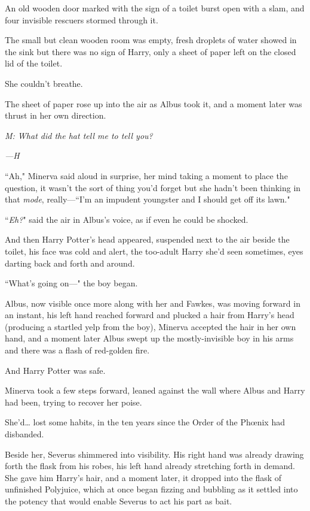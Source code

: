 An old wooden door marked with the sign of a toilet burst open with a slam, and four invisible rescuers stormed through it.

The small but clean wooden room was empty, fresh droplets of water showed in the sink but there was no sign of Harry, only a sheet of paper left on the closed lid of the toilet.

She couldn't breathe.

The sheet of paper rose up into the air as Albus took it, and a moment later was thrust in her own direction.

\emph{M: What did the hat tell me to tell you?}

\emph{—H}

``Ah," Minerva said aloud in surprise, her mind taking a moment to place the question, it wasn't the sort of thing you'd forget but she hadn't been thinking in that \emph{mode}, really—``I'm an impudent youngster and I should get off its lawn."

``\emph{Eh?}" said the air in Albus's voice, as if even he could be shocked.

And then Harry Potter's head appeared, suspended next to the air beside the toilet, his face was cold and alert, the too-adult Harry she'd seen sometimes, eyes darting back and forth and around.

``What's going on—" the boy began.

Albus, now visible once more along with her and Fawkes, was moving forward in an instant, his left hand reached forward and plucked a hair from Harry's head (producing a startled yelp from the boy), Minerva accepted the hair in her own hand, and a moment later Albus swept up the mostly-invisible boy in his arms and there was a flash of red-golden fire.

And Harry Potter was safe.

Minerva took a few steps forward, leaned against the wall where Albus and Harry had been, trying to recover her poise.

She'd{\ldots} lost some habits, in the ten years since the Order of the Phœnix had disbanded.

Beside her, Severus shimmered into visibility. His right hand was already drawing forth the flask from his robes, his left hand already stretching forth in demand. She gave him Harry's hair, and a moment later, it dropped into the flask of unfinished Polyjuice, which at once began fizzing and bubbling as it settled into the potency that would enable Severus to act his part as bait.

